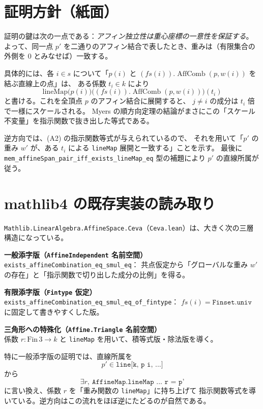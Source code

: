 \documentclass[a4paper,12pt]{bxjsbook}
\newlength{\customindent}
\newenvironment{body}{
  \par
  \begingroup
  \setlength{\leftskip}{\customindent}
  \setlength{\rightskip}{0pt}
  \setlength{\parindent}{1em}
  \setlength{\displayindent}{\customindent}
  \setlength{\displaywidth}{\dimexpr\linewidth-\customindent\relax}
}{
  \par
  \endgroup
}
\theoremstyle{theorem}
\DeclareMathOperator{\AffComb}{AffComb}
\begin{document}
    \section{証明方針（紙面）}\label{sec:proof-idea}
    \begin{body}
        \indent 証明の鍵は次の一点である：\emph{アフィン独立性は重心座標の一意性を保証する}。
        よって、同一点 $p'$ を二通りのアフィン結合で表したとき、重みは（有限集合の外側を 0 とみなせば）一致する。

        \indent 具体的には、各 $i\in s$ について「$p(i)$ と $(fs(i)).\AffComb(p,w(i))$ を結ぶ直線上の点」は、
        ある係数 $t_i\in k$ により
        \[
          \mathrm{lineMap}\bigl(p(i)\bigr)\bigl((fs(i)).\AffComb(p,w(i))\bigr)(t_i)
        \]
        と書ける。これを全頂点 $p$ のアフィン結合に展開すると、
        $j\neq i$ の成分は $t_i$ 倍で一様にスケールされる。
        Myers の順方向定理の結論がまさにこの「スケール不変量」を指示関数で抜き出した等式である。

        \indent 逆方向では、(A2) の指示関数等式が与えられているので、
        それを用いて「$p'$ の重み $w'$ が、ある $t_i$ による \texttt{lineMap} 展開と一致する」ことを示す。
        最後に \texttt{mem\_affineSpan\_pair\_iff\_exists\_lineMap\_eq} 型の補題により
        $p'$ の直線所属が従う。
    \end{body}

    \section{mathlib4 の既存実装の読み取り}\label{sec:read-mathlib}
    \begin{body}
        \indent \texttt{Mathlib.LinearAlgebra.AffineSpace.Ceva}（\texttt{Ceva.lean}）は、大きく次の三層構造になっている。
        \begin{bodyenumerate}
            \item \textbf{一般添字版（\texttt{AffineIndependent} 名前空間）}\\
            \texttt{exists\_affineCombination\_eq\_smul\_eq}：
            共点仮定から「グローバルな重み $w'$ の存在」と「指示関数で切り出した成分の比例」を得る。
            \item \textbf{有限添字版（\texttt{Fintype} 仮定）}\\
            \texttt{exists\_affineCombination\_eq\_smul\_eq\_of\_fintype}：
            $fs(i)=\texttt{Finset.univ}$ に固定して書きやすくした版。
            \item \textbf{三角形への特殊化（\texttt{Affine.Triangle} 名前空間）}\\
            係数 $r:\mathrm{Fin}\,3\to k$ と \texttt{lineMap} を用いて、積等式版・除法版を導く。
        \end{bodyenumerate}

        \indent 特に一般添字版の証明では、直線所属を
        \[
          p' \in \texttt{line[k, p i, ...]}
        \]
        から
        \[
          \exists r,\ \texttt{AffineMap.lineMap ... r = p'}
        \]
        に言い換え、係数 $r$ を「重み関数の \texttt{lineMap}」に持ち上げて
        指示関数等式を導いている。逆方向はこの流れをほぼ逆にたどるのが自然である。
    \end{body}
\end{document}
